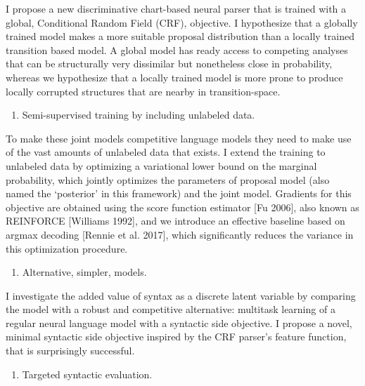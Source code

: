 \documentclass[]{article}
\providecommand{\tightlist}{%
  \setlength{\itemsep}{0pt}\setlength{\parskip}{0pt}}
\begin{document}
I propose a new discriminative chart-based neural parser that is trained
with a global, Conditional Random Field (CRF), objective. I hypothesize
that a globally trained model makes a more suitable proposal
distribution than a locally trained transition based model. A global
model has ready access to competing analyses that can be structurally
very dissimilar but nonetheless close in probability, whereas we
hypothesize that a locally trained model is more prone to produce
locally corrupted structures that are nearby in transition-space.

\begin{enumerate}
\def\labelenumi{\arabic{enumi}.}
\setcounter{enumi}{1}
\tightlist
\item
  Semi-supervised training by including unlabeled data.
\end{enumerate}

To make these joint models competitive language models they need to make
use of the vast amounts of unlabeled data that exists. I extend the
training to unlabeled data by optimizing a variational lower bound on
the marginal probability, which jointly optimizes the parameters of
proposal model (also named the `posterior' in this framework) and the
joint model. Gradients for this objective are obtained using the score
function estimator {[}Fu 2006{]}, also known as REINFORCE {[}Williams
1992{]}, and we introduce an effective baseline based on argmax decoding
{[}Rennie et al. 2017{]}, which significantly reduces the variance in
this optimization procedure.

\begin{enumerate}
\def\labelenumi{\arabic{enumi}.}
\setcounter{enumi}{2}
\tightlist
\item
  Alternative, simpler, models.
\end{enumerate}

I investigate the added value of syntax as a discrete latent variable by
comparing the model with a robust and competitive alternative: multitask
learning of a regular neural language model with a syntactic side
objective. I propose a novel, minimal syntactic side objective inspired
by the CRF parser's feature function, that is surprisingly successful.

\begin{enumerate}
\def\labelenumi{\arabic{enumi}.}
\setcounter{enumi}{3}
\tightlist
\item
  Targeted syntactic evaluation.
\end{enumerate}
\end{document}
